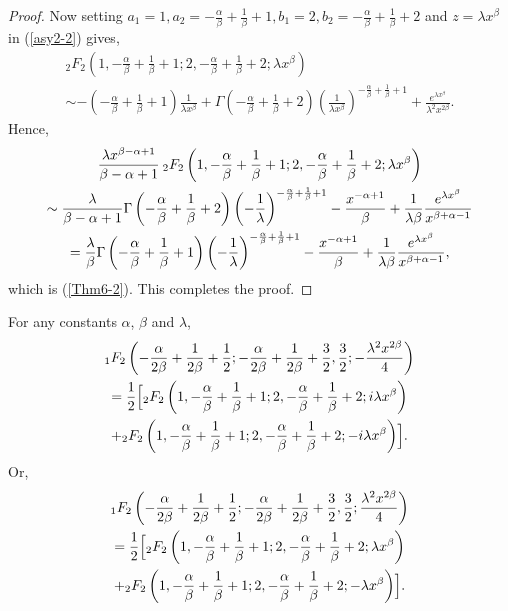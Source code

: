 \documentclass[smallextended]{svjour3}
\begin{document}
\begin{proof}
Now setting $a_1=1, a_2=-\frac{\alpha}{\beta}+\frac{1}{\beta}+1, b_1=2, b_2=-\frac{\alpha}{\beta}+\frac{1}{\beta}+2$ and $z=\lambda x^\beta$ in (\ref{asy2-2}) gives,
\begin{multline}
_{2}F_{2}\left(1,-\frac{\alpha}{\beta}+\frac{1}{\beta}+1;2,-\frac{\alpha}{\beta}+\frac{1}{\beta}+2;\lambda x^\beta\right)\\
\sim -\left(-\frac{\alpha}{\beta}+\frac{1}{\beta}+1\right)\frac{1}{\lambda x^\beta}
+\Gamma\left(-\frac{\alpha}{\beta}+\frac{1}{\beta}+2\right)\left(\frac{1}{\lambda x^\beta}\right)^{-\frac{\alpha}{\beta}+\frac{1}{\beta}+1}+\frac{e^{\lambda x^\beta}}{\lambda^2 x^{2\beta}}.
\end{multline}
Hence,
\begin{multline}
\frac{\lambda x^{\beta-\alpha+1}}{\beta-\alpha+1} \hspace{.075cm}_{2}F_{2}\left(1,-\frac{\alpha}{\beta}+\frac{1}{\beta}+1;2,-\frac{\alpha}{\beta}+\frac{1}{\beta}+2;\lambda x^\beta\right)\\
\sim \frac{\lambda}{\beta-\alpha+1} \Gamma\left(-\frac{\alpha}{\beta}+\frac{1}{\beta}+2\right)\left(-\frac{1}{\lambda }\right)^{-\frac{\alpha}{\beta}+\frac{1}{\beta}+1}-\frac{x^{-\alpha+1}}{\beta}
+\frac{1}{\lambda\beta}\frac{e^{\lambda x^\beta}}{x^{\beta+\alpha-1}}\\
=\frac{\lambda}{\beta} \Gamma\left(-\frac{\alpha}{\beta}+\frac{1}{\beta}+1\right)\left(-\frac{1}{\lambda }\right)^{-\frac{\alpha}{\beta}+\frac{1}{\beta}+1}-\frac{x^{-\alpha+1}}{\beta}
+\frac{1}{\lambda\beta}\frac{e^{\lambda x^\beta}}{x^{\beta+\alpha-1}},\nonumber
\end{multline}
which is (\ref{Thm6-2}). This completes the proof.
\end{proof}


\begin{theorem}
For any constants $\alpha$, $\beta$ and $\lambda$,
\begin{multline}
_{1}F_{2}\left(-\frac{\alpha}{2\beta}+\frac{1}{2\beta}+\frac{1}{2};-\frac{\alpha}{2\beta}+\frac{1}{2\beta}+\frac{3}{2},\frac{3}{2};-\frac{\lambda^2 x^{2\beta}}{4}\right)\\=\frac{1}{2}\Bigl[{}_{2}F_{2}\left(1,-\frac{\alpha}{\beta}+\frac{1}{\beta}+1;2,-\frac{\alpha}{\beta}+\frac{1}{\beta}+2;i\lambda x^\beta\right)\\+{}_{2}F_{2}\left(1,-\frac{\alpha}{\beta}+\frac{1}{\beta}+1;2,-\frac{\alpha}{\beta}+\frac{1}{\beta}+2;-i\lambda x^\beta\right)\Bigr].
\label{Thm7-1}
\end{multline}
Or,
\begin{multline}
_{1}F_{2}\left(-\frac{\alpha}{2\beta}+\frac{1}{2\beta}+\frac{1}{2};-\frac{\alpha}{2\beta}+\frac{1}{2\beta}+\frac{3}{2},\frac{3}{2};\frac{\lambda^2 x^{2\beta}}{4}\right)\\=\frac{1}{2}\Bigl[{}_{2}F_{2}\left(1,-\frac{\alpha}{\beta}+\frac{1}{\beta}+1;2,-\frac{\alpha}{\beta}+\frac{1}{\beta}+2;\lambda x^\beta\right)\\+{}_{2}F_{2}\left(1,-\frac{\alpha}{\beta}+\frac{1}{\beta}+1;2,-\frac{\alpha}{\beta}+\frac{1}{\beta}+2;-\lambda x^\beta\right)\Bigr].
\label{Thm7-2}
\end{multline}
\label{Thm7}
\end{theorem}
\end{document}
